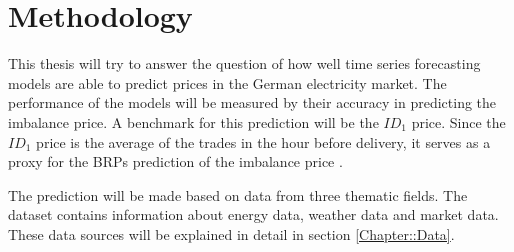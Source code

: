 \documentclass[class=scrbook, crop=false]{standalone}
\begin{document}
\section{Methodology}
\label{Section::Methodology}
This thesis will try to answer the question of how well time series forecasting models are able to predict prices in the German electricity market. The performance of the models will be measured by their accuracy in predicting the imbalance price. A benchmark for this prediction will be the $ID_1$ price. Since the $ID_1$ price is the average of the trades in the hour before delivery, it serves as a proxy for the BRPs prediction of the imbalance price \cite{narajewskiProbabilisticForecastingGerman2022}. 


The prediction will be made based on data from three thematic fields. 
The dataset contains information about energy data, weather data and market data. 
These data sources will be explained in detail in section \ref{Chapter::Data}.

\end{document}
